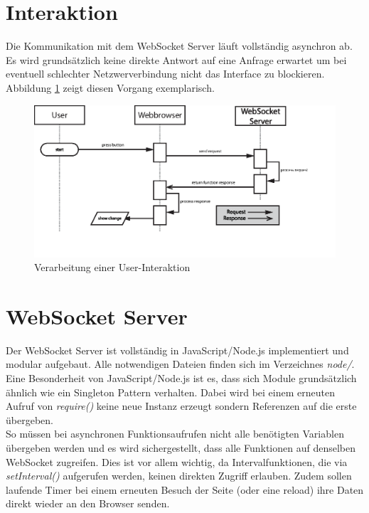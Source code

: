 \section{Interaktion}
Die Kommunikation mit dem WebSocket Server läuft vollständig asynchron ab. Es wird grundsätzlich keine direkte Antwort auf eine Anfrage erwartet um bei eventuell schlechter Netzwerverbindung nicht das Interface zu blockieren. Abbildung \ref{fig:interaction} zeigt diesen Vorgang exemplarisch.

\begin{figure}[ht]
  \includegraphics[width = \textwidth]{dokumentation/images/sendRequest.eps}
  \caption{Verarbeitung einer User-Interaktion}
  \label{fig:interaction}
\end{figure}


\section{WebSocket Server}
Der WebSocket Server ist vollständig in JavaScript/Node.js implementiert und modular aufgebaut. Alle notwendigen Dateien finden sich im Verzeichnes \textit{node/}.\\
Eine Besonderheit von JavaScript/Node.js ist es, dass sich Module grundsätzlich ähnlich wie ein Singleton Pattern verhalten. Dabei wird bei einem erneuten Aufruf von \textit{require()} keine neue Instanz erzeugt sondern Referenzen auf die erste übergeben.\\
So müssen bei asynchronen Funktionsaufrufen nicht alle benötigten Variablen übergeben werden und es wird sichergestellt, dass alle Funktionen auf denselben WebSocket zugreifen. Dies ist vor allem wichtig, da Intervalfunktionen, die via \textit{setInterval()} aufgerufen werden, keinen direkten Zugriff erlauben. Zudem sollen laufende Timer bei einem erneuten Besuch der Seite (oder eine reload) ihre Daten direkt wieder an den Browser senden.\\

